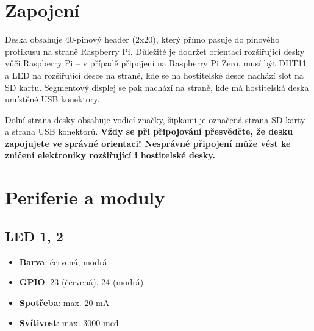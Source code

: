 \documentclass{article}
\newcommand\lang[2]{#1}
\begin{document}
\section{\lang{Zapojení}{Connection}}
\setlength{\parskip}{4pt}
\lang{Deska obsahuje 40-pinový header (2x20), který přímo pasuje do pinového protikusu na straně Raspberry Pi. Důležité je dodržet orientaci rozšiřující desky vůči Raspberry Pi -- v případě připojení na Raspberry Pi Zero, musí být DHT11 a LED na rozšiřující desce na straně, kde se na hostitelské desce nachází slot na SD kartu. Segmentový displej se pak nachází na straně, kde má hostitelská deska umístěné USB konektory.
}
{
The board contains a 40-pin F header, which is intended to be directly connected to M header on the Raspberry Pi side. It is important to rotate the board correctly -- in case of Raspberry Pi Zero, the DHT11 sensor and LEDs on the expansion board must be on the same side, as the SD card slot on the host board. The segment display is then localized on the same side, as USB ports on the host board.
}

\noindent
\lang{Dolní strana desky obsahuje vodicí značky, šipkami je označená strana SD karty a strana USB konektorů. \textbf{Vždy se při připojování přesvědčte, že desku zapojujete ve správné orientaci! Nesprávné připojení může vést ke zničení elektroniky rozšiřující i hostitelské desky.}}{The bottom side of the expansion board contains markers -- arrows pointing at the SD card side and USB side. \textbf{Always make sure, that you are connecting the expansion board the right way! Incorrect connection may lead to the destruction of electronics of the expansion or host board.}}

\section{\lang{Periferie a moduly}{Peripherals and modules}}

\subsection{LED 1, 2}

\begin{itemize}[nosep]
	\item \lang{\textbf{Barva}: červená, modrá}{\textbf{Color}: red, blue}
	\item \textbf{GPIO}: 23 \lang{(červená)}{(red)}, 24 \lang{(modrá)}{(blue)}
	\item \textbf{\lang{Spotřeba}{Current}}: max. 20 mA
	\item \textbf{\lang{Svítivost}{Luminosity}}: max. 3000 mcd
\end{itemize}
\end{document}
